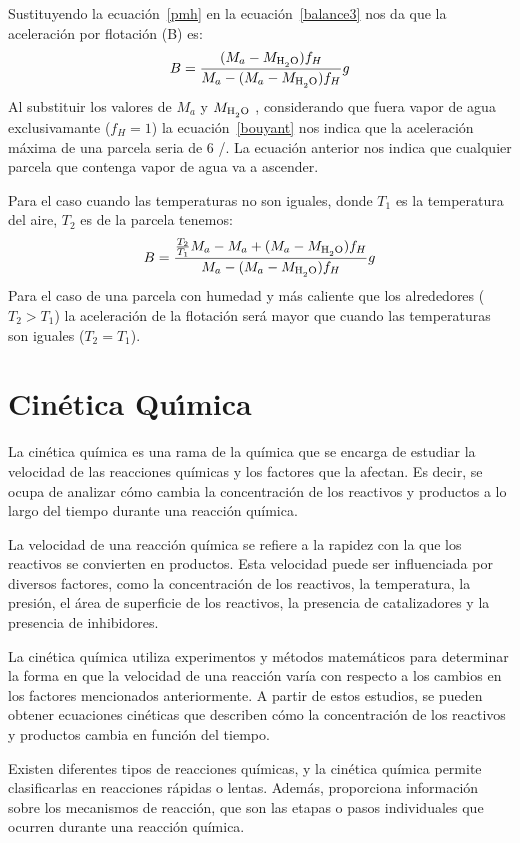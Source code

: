 Sustituyendo la ecuaci\'on~\ref{pmh} en la ecuaci\'on~\ref{balance3} nos da que la aceleraci\'on por flotaci\'on (B) es:
\begin{equation}
B=\frac{(M_a-M_{\ce{H2O}})f_H }{M_a-(M_a-M_{\ce{H2O}})f_H} g
\label{bouyant}
\end{equation}
Al substituir los valores de $M_a$ y $M_{\ce{H2O}}$ , considerando que fuera  vapor de agua exclusivamante ($f_H=1$) la ecuaci\'on~\ref{bouyant} nos indica que la aceleraci\'on m\'axima de una parcela seria de  $6$ \metre/\square\second . La ecuaci\'on anterior nos indica que cualquier parcela que contenga vapor de agua va a ascender.

Para el caso cuando las temperaturas no son iguales,  donde $T_1$ es la temperatura del aire, $T_2$ es de la parcela tenemos:
\begin{equation}
B=\frac{\frac{T_2}{T_1}M_a-M_a+(M_a-M_{\ce{H2O}})f_H }{M_a-(M_a-M_{\ce{H2O}})f_H} g
\label{bouyant2}
\end{equation}
Para el caso de una parcela con humedad y m\'as caliente que los alrededores ($T_2>T_1$) la aceleraci\'on de la flotaci\'on ser\'a mayor que cuando las temperaturas son iguales ($T_2=T_1$). 

\section{Cin\'etica Qu\'{\i}mica}
La cinética química es una rama de la química que se encarga de estudiar la velocidad de las reacciones químicas y los factores que la afectan. Es decir, se ocupa de analizar cómo cambia la concentración de los reactivos y productos a lo largo del tiempo durante una reacción química.

La velocidad de una reacción química se refiere a la rapidez con la que los reactivos se convierten en productos. Esta velocidad puede ser influenciada por diversos factores, como la concentración de los reactivos, la temperatura, la presión, el área de superficie de los reactivos, la presencia de catalizadores y la presencia de inhibidores.

La cinética química utiliza experimentos y métodos matemáticos para determinar la forma en que la velocidad de una reacción varía con respecto a los cambios en los factores mencionados anteriormente. A partir de estos estudios, se pueden obtener ecuaciones cinéticas que describen cómo la concentración de los reactivos y productos cambia en función del tiempo.

Existen diferentes tipos de reacciones químicas, y la cinética química permite clasificarlas en reacciones rápidas o lentas. Además, proporciona información sobre los mecanismos de reacción, que son las etapas o pasos individuales que ocurren durante una reacción química.

